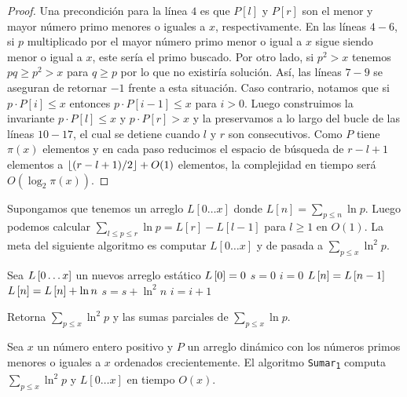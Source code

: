 \begin{proof}
    Una precondici\'on para la l\'inea \(4\) es que
    \(P[l]\) y \(P[r]\) son el menor y mayor n\'umero primo
    menores o iguales a \(x\), respectivamente.
    En las l\'ineas \(4-6\), si \(p\) multiplicado por el mayor n\'umero primo menor o igual a \(x\)
    sigue siendo menor o igual a \(x\), este ser\'ia el primo buscado.
    Por otro lado, si \(p^2 > x\) tenemos \(pq \geq p^2 > x\) para \(q \geq p\)
    por lo que no existir\'ia soluci\'on.
    As\'i, las l\'ineas \(7-9\) se aseguran de retornar \(-1\) frente a esta situaci\'on.
    Caso contrario, notamos que si \(p \cdot P[i] \leq x\)
    entonces \(p \cdot P[i - 1] \leq x\) para \(i > 0\).
    Luego construimos la invariante \(p \cdot P[l] \leq x\) y \(p \cdot P[r] > x\)
    y la preservamos a lo largo del bucle de las l\'ineas \(10-17\),
    el cual se detiene cuando \(l\) y \(r\) son consecutivos.
    Como \(P\) tiene \(\pi(x)\) elementos y en cada paso
    reducimos el espacio de b\'usqueda de \(r - l + 1\) elementos
    a \(\left\lfloor (r - l + 1) / 2 \right\rfloor + O(1)\) elementos,
    la complejidad en tiempo ser\'a \(O(\log_2 \pi(x))\).
\end{proof}

Supongamos que tenemos un arreglo \(L[0 \dots x]\) donde
\(L[n] = \sum_{p \leq n} \ln p\).
Luego podemos calcular \(\sum_{l \leq p \leq r} \ln p = L[r] - L[l - 1]\) para \(l \geq 1\)
en \(O(1)\).
La meta del siguiente algoritmo es computar \(L[0 \dots x]\)
y de pasada a \(\sum_{p \leq x} \ln^2 p\).

\begin{algorithm}[H]
    \SetAlgoLined
    \DontPrintSemicolon
     {
        Sea \(L\left[ 0 \dots x \right]\) un nuevos arreglo est\'atico\;
        \(L\left[ 0 \right] = 0\)\;
        \(s = 0\)\;
        \(i = 0\)\;
         {
            \(L\left[ n \right] = L\left[ n - 1 \right]\)\;
             {
                \(L\left[ n \right] = L\left[ n \right] + \ln n\)\;
                \(s = s + \ln^2 n\)\;
                \(i = i + 1\)\;
            }
        }
    }
    \caption{Retorna \(\sum_{p \leq x} \ln^2 p\) y las sumas parciales de \(\sum_{p \leq x} \ln p\).}
\end{algorithm}

\begin{theorem}
    \label{thm:sum-1}
    Sea \(x\) un n\'umero entero positivo y
    \(P\) un arreglo din\'amico con los n\'umeros primos menores o iguales a \(x\) ordenados crecientemente.
    El algoritmo \texttt{Sumar\textsubscript{1}} computa \(\sum_{p \leq x} \ln^2 p\) y \(L[0 \dots x]\)
    en tiempo \(O(x)\).
\end{theorem}

